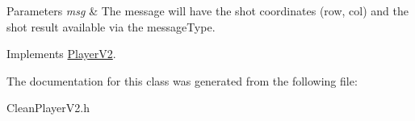 \begin{DoxyParams}{Parameters}
{\em msg} & The message will have the shot coordinates (row, col) and the shot result available via the message\+Type. \\
\hline
\end{DoxyParams}


Implements \hyperlink{classPlayerV2_a8d87312a1ce2756e25bb6e6438e8673c}{Player\+V2}.



The documentation for this class was generated from the following file\+:\begin{DoxyCompactItemize}
\item 
Clean\+Player\+V2.\+h\end{DoxyCompactItemize}

